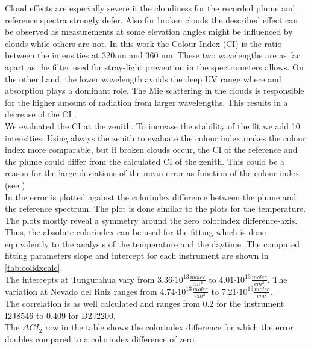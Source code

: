 Cloud effects are especially severe if the cloudiness for the recorded plume and reference spectra strongly defer. Also for broken clouds the described effect can be observed as measurements at some elevation angles might be influenced by clouds while others are not.
In this work the Colour Index (CI) is the ratio between the intensities at 320nm and 360 nm.
These two wavelengths are as far apart as the filter used for stray-light prevention in the spectrometers allows.
On the other hand, the lower wavelength avoids the deep UV range where  and   absorption plays a dominant role.
The Mie scattering in the clouds is responsible for the higher amount of radiation from larger wavelengths. This results in a decrease of the CI \citep{lubcke2014optical}.\\
We evaluated the CI at the zenith. To increase the stability of the fit we add 10 intensities. Using always the zenith to evaluate the colour index makes the colour index more comparable, but if broken clouds occur, the CI of the reference and the plume could differ from the calculated CI of the zenith. This could be a reason for the large deviations of the mean  error as function of the colour index (see )\\
In  the  error is plotted against the colorindex difference between the plume and the reference spectrum. The plot is done similar to the plots for the temperature.
The plots mostly reveal a symmetry around the zero colorindex difference-axis. Thus, the absolute colorindex can be used for the fitting which is done equivalently to the analysis of the temperature and the daytime. The computed fitting parameters slope and intercept for each instrument are shown in \cref{tab:colidxcalc}. \\
The intercepts at Tungurahua vary from 3.36$\cdot10^{13}\frac{molec}{cm^2}$ to 4.01$\cdot10^{13}\frac{molec}{cm^2}$. The variation at Nevado del Ruiz ranges from  4.74$\cdot10^{13}\frac{molec}{cm^2}$ to 7.21$\cdot10^{13}\frac{molec}{cm^2}$.\\
The correlation is as well calculated and ranges from 0.2 for the instrument I2J8546 to  0.409 for D2J2200.\\
The $\Delta CI_{2}$ row in the table shows the colorindex difference for which the error doubles compared to a colorindex difference of zero.
